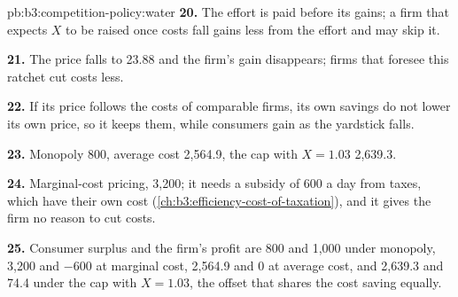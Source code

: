 \begin{solution}{pb:b3:competition-policy:water}
\textbf{20.} The effort is paid before its gains; a firm that expects $X$ to be raised
once costs fall gains less from the effort and may skip it.

\textbf{21.} The price falls to 23.88 and the firm's gain disappears; firms that foresee
this ratchet cut costs less.

\textbf{22.} If its price follows the costs of comparable firms, its own savings do not
lower its own price, so it keeps them, while consumers gain as the yardstick falls.

\textbf{23.} Monopoly 800, average cost 2{,}564.9, the cap with $X = 1.03$ 2{,}639.3.

\textbf{24.} Marginal-cost pricing, 3{,}200; it needs a subsidy of 600 a day from taxes, which have
their own cost (\cref{ch:b3:efficiency-cost-of-taxation}), and it gives the firm no reason to cut costs.

\textbf{25.} Consumer surplus and the firm's profit are 800 and 1{,}000 under monopoly, 3{,}200 and $-600$ at
marginal cost, 2{,}564.9 and 0 at average cost, and 2{,}639.3 and 74.4 under the cap with $X = 1.03$, the offset
that shares the cost saving equally.
\end{solution}
